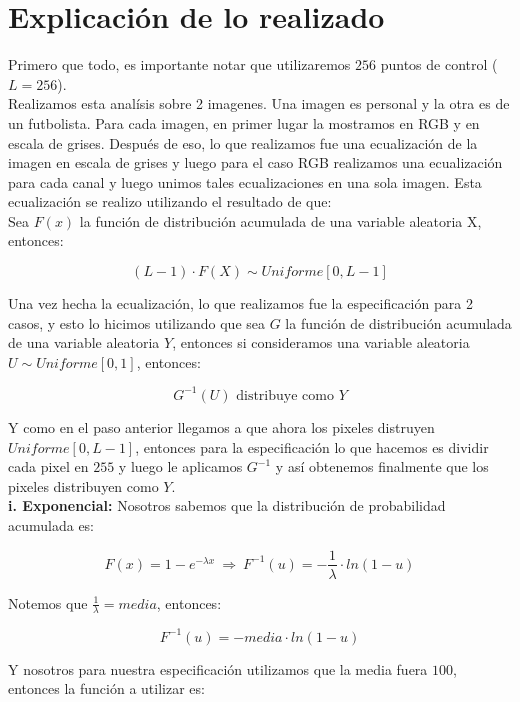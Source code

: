 \documentclass[11pt]{article}
\begin{document}
\providecommand{\abs}[1]{\lvert#1\rvert}

\providecommand{\norm}[1]{\lVert#1\rVert}

\section{Explicación de lo realizado}

Primero que todo, es importante notar que utilizaremos $256$ puntos de control ($L = 256 $). \\

Realizamos esta analísis sobre 2 imagenes. Una imagen es personal y la otra es de un futbolista. Para cada imagen, en primer lugar la mostramos en RGB y en escala de grises. Después de eso, lo que realizamos fue una ecualización de la imagen en escala de grises y luego para el caso RGB realizamos una ecualización para cada canal y luego unimos tales ecualizaciones en una sola imagen. Esta ecualización se realizo utilizando el resultado de que: \\

Sea  $F(x)$ la función de distribución acumulada de una variable aleatoria X, entonces: 

\[ (L-1) \cdot F(X) \sim Uniforme[0,L-1] \]

Una vez hecha la ecualización, lo que realizamos fue la especificación para 2 casos, y esto lo hicimos utilizando que sea $ G $ la función de distribución acumulada de una variable aleatoria $ Y $, entonces si consideramos una variable aleatoria $ U \sim Uniforme[0,1] $, entonces:

\[ G^{-1}(U) \text{ distribuye como } Y \]

Y como en el paso anterior llegamos a que ahora los pixeles distruyen $Uniforme[0,L-1]$, entonces para la especificación lo que hacemos es dividir cada pixel en $255$ y luego le aplicamos $ G^{-1} $ y así obtenemos finalmente que los pixeles distribuyen como $ Y $. \\

\textbf{i. Exponencial:} Nosotros sabemos que la distribución de probabilidad acumulada es:

\[ F(x) = 1 - e^{-\lambda x} \ \Rightarrow \ F^{-1}(u) = - \frac{1}{\lambda} \cdot ln (1-u) \]

Notemos que $ \frac{1}{\lambda} = media $, entonces:

\[ F^{-1}(u) = - media \cdot ln(1-u) \]

Y nosotros para nuestra especificación utilizamos que la media fuera $ 100 $, entonces la función a utilizar es:
\end{document}
